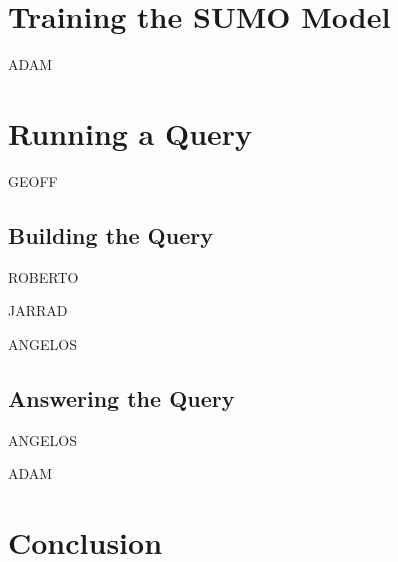 \documentclass[runningheads]{llncs}
\begin{document}
\section{Training the SUMO Model}
\label{Training}

ADAM

\section{Running a Query}
\label{Running}

GEOFF

\subsection{Building the Query}
\label{BuildingQuery}

ROBERTO

JARRAD

ANGELOS

\subsection{Answering the Query}
\label{AnsweringQuery}

ANGELOS

ADAM

\section{Conclusion}
\label{Conclusion}



\end{document}
